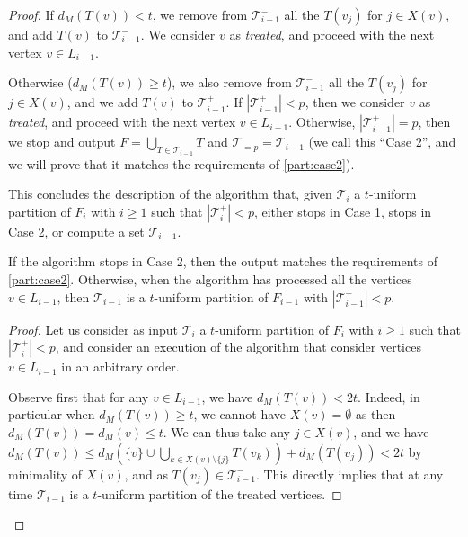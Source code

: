 \documentclass{amsart}
\newcommand{\mT}{\mathcal{T}}
\begin{document}
\begin{proof}
If $d_M(T(v)) < t$,
we remove from $\mT_{i-1}^-$ all the $T(v_j)$ for $j \in X(v)$, and add $T(v)$ to $\mT_{i-1}^-$. We consider $v$ as \emph{treated}, and proceed with the next vertex $v \in L_{i-1}$.
 
Otherwise ($d_M(T(v)) \ge  t$), we also remove from $\mT_{i-1}^-$ all the $T(v_j)$ for $j \in X(v)$, and we add $T(v)$ to $\mT_{i-1}^+$. 
If $|\mT_{i-1}^+|<p$, then we consider $v$ as \emph{treated}, and proceed with the next vertex $v \in L_{i-1}$.
Otherwise, $|\mT_{i-1}^+|=p$, then we stop and output $F=\bigcup_{T \in \mT_{i-1}} T$ and $\mT_{=p} = \mT_{i-1}$ (we call this ``Case 2'', and we will prove that 
it matches the requirements of  \autoref{part:case2}).

This concludes the description of the algorithm that, given $\mT_i$ a $t$-uniform partition of $F_i$ with $i\geq 1$ such that $|\mT_i^+| < p$, either stops in Case 1,  stops in Case 2, 
or compute a set $\mT_{i-1}$. 

\begin{claim}\label{claim:part}
If the algorithm stops in Case 2, then the output matches the requirements of \autoref{part:case2}. Otherwise, when the algorithm has processed all the vertices $v \in L_{i-1}$, then $\mT_{i-1}$ is a $t$-uniform partition of $F_{i-1}$ with $|\mT_{i-1}^+| < p$.
\end{claim}
\begin{proof}
Let us consider as input $\mT_i$ a $t$-uniform partition of $F_i$ with $i\geq 1$ such that $|\mT_i^+| < p$, and consider an execution of the algorithm that consider vertices $v \in L_{i-1}$ in an arbitrary order.

Observe first that for any $v \in L_{i-1}$, we have $d_M(T(v))<2t$. Indeed, in particular when $d_M(T(v)) \ge t$, 
we cannot have $X(v)=\emptyset$ as then $d_M(T(v))=d_M(v) \le t$. We can thus take any $j \in X(v)$, and we have $d_M(T(v)) \le d_M\left(\{v\}\cup \bigcup_{k \in X(v)\setminus \{j\}} T(v_k)\right) + d_M\left(T(v_j)\right) < 2t$ by minimality of $X(v)$, and as $T(v_j) \in \mT_{i-1}^-$.
This directly implies that 
at any time $\mT_{i-1}$ is a $t$-uniform partition of the treated vertices.


\end{proof}
\end{proof}
\end{document}
